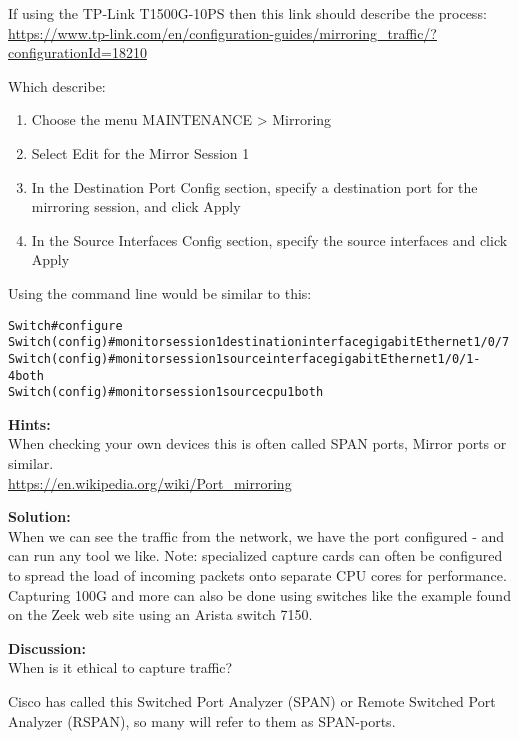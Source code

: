 \documentclass[a4paper,11pt,notitlepage]{report}
\begin{document}
If using the TP-Link T1500G-10PS then this link should describe the process:\\
{\small\url{https://www.tp-link.com/en/configuration-guides/mirroring_traffic/?configurationId=18210}}

Which describe:
\begin{enumerate}
\item Choose the menu MAINTENANCE > Mirroring
\item Select Edit for the Mirror Session 1
\item In the Destination Port Config section, specify a destination port for the mirroring session, and click Apply
\item In the Source Interfaces Config section, specify the source interfaces and click Apply
\end{enumerate}

Using the command line would be similar to this:
\begin{alltt}
Switch#configure
Switch(config)#monitor session 1 destination interface gigabitEthernet 1/0/7
Switch(config)#monitor session 1 source interface gigabitEthernet 1/0/1-4 both
Switch(config)#monitor session 1 source cpu 1 both
\end{alltt}



{\bf Hints:}\\
When checking your own devices this is often called SPAN ports, Mirror ports or similar.\\
\url{https://en.wikipedia.org/wiki/Port_mirroring}



{\bf Solution:}\\
When we can see the traffic from the network, we have the port configured - and can run any tool we like. Note: specialized capture cards can often be configured to spread the load of incoming packets onto separate CPU cores for performance. Capturing 100G and more can also be done using switches like the example found on the Zeek web site using an Arista switch 7150.


{\bf Discussion:}\\
When is it ethical to capture traffic?

Cisco has called this Switched Port Analyzer (SPAN) or Remote Switched Port Analyzer (RSPAN), so many will refer to them as SPAN-ports.
\end{document}
